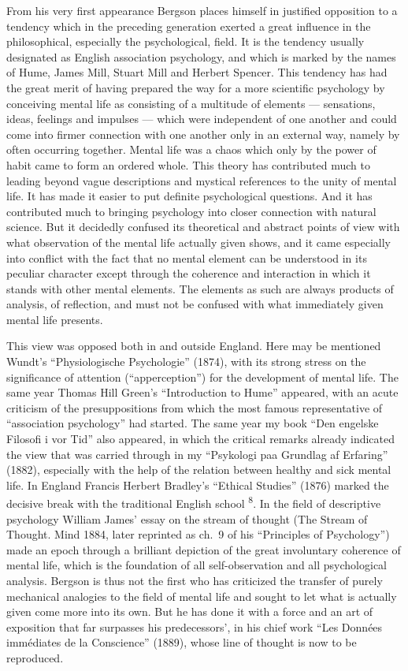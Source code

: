 \documentclass[12pt,a4paper,openany]{book}
\newcommand{\opage}[1]{\marginnote{\footnotesize\textit{[#1]}}}
\newcommand{\nm}[1]{\unskip\textsuperscript{#1}}
\begin{document}
From his very first appearance Bergson places himself in justified opposition to a tendency which in the preceding generation exerted a great influence in the philosophical, especially the psychological, field. It is the tendency usually designated as English association psychology, and which is marked by the names of Hume, James Mill, Stuart Mill and Herbert Spencer. This tendency has had the great merit of having prepared the way for a more scientific psychology by conceiving mental life as consisting of a multitude of elements --- sensations,
\opage{12}ideas, feelings and impulses --- which were independent of one another and could come into firmer connection with one another only in an external way, namely by often occurring together. Mental life was a chaos which only by the power of habit came to form an ordered whole. This theory has contributed much to leading beyond vague descriptions and mystical references to the unity of mental life. It has made it easier to put definite psychological questions. And it has contributed much to bringing psychology into closer connection with natural science. But it decidedly confused its theoretical and abstract points of view with what observation of the mental life actually given shows, and it came especially into conflict with the fact that no mental element can be understood in its peculiar character except through the coherence and interaction in which it stands with other mental elements. The elements as such are always products of analysis, of reflection, and must not be confused with what immediately given mental life presents.

This view was opposed both in and outside England. Here may be mentioned Wundt's ``Physiologische Psychologie'' (1874), with its strong stress on the significance of attention (``apperception'') for the development of mental life. The same year Thomas Hill Green's ``Introduction to Hume'' appeared, with an acute criticism of the presuppositions from which the most famous representative of ``association psychology'' had started. The same year my book ``Den engelske Filosofi i vor Tid'' also appeared, in which the critical remarks already indicated the view that was carried through in my ``Psykologi paa Grundlag af Erfaring'' (1882), especially with the help of the relation between healthy and sick mental life. In England Francis Herbert Bradley's ``Ethical Studies'' (1876) marked the decisive break with the traditional English school \nm{8}. In the field of descriptive psychology William James' essay on the stream of thought (The Stream of Thought. Mind 1884, later reprinted as ch.\ 9 of his ``Principles of Psychology'') made an epoch through a brilliant depiction of the great involuntary coherence of mental life, which is the foundation of all self-observation and all psychological analysis.
\opage{13}Bergson is thus not the first who has criticized the transfer of purely mechanical analogies to the field of mental life and sought to let what is actually given come more into its own. But he has done it with a force and an art of exposition that far surpasses his predecessors', in his chief work ``Les Données immédiates de la Conscience'' (1889), whose line of thought is now to be reproduced.
\end{document}

